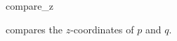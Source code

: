 \begin{ccRefFunction}{compare_z}

        {compares the $z$-coordinates of $p$ and $q$.}

\end{ccRefFunction}


